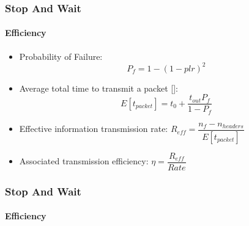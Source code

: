 


\begin{frame}		
	\frametitle{Stop And Wait}
	\framesubtitle{Efficiency}
	\begin{itemize}
		\item Probability of Failure\footnotemark:
			$$P_f = 1 - (1-plr)^2$$
		\item Average total time to transmit a packet [\cite{1}]:
			$$E[t_{packet}] = t_0 + \dfrac{t_{out} P_{f}}{1-P_{f}}$$
		\item Effective information transmission rate: $R_{eff} =\dfrac{n_f - n_{headers}}{E[t_{packet}]}$
		\item Associated transmission efficiency: $\eta = \dfrac{R_{eff}}{Rate}$
		

	\end{itemize}
\end{frame}


\begin{frame}		
	\frametitle{Stop And Wait}
	\framesubtitle{Efficiency}

\begin{columns}
	\begin{column}{0.5\textwidth}  %
	\begin{center}
		\begin{figure}[H]
		\end{figure}
	\end{center}
	\centering 
\end{column}
	\begin{column}{0.5\textwidth}  %
		\begin{center}
			\begin{figure}[H]
			\end{figure}
		\end{center}
		\centering 
	\end{column}
\end{columns}


\end{frame}